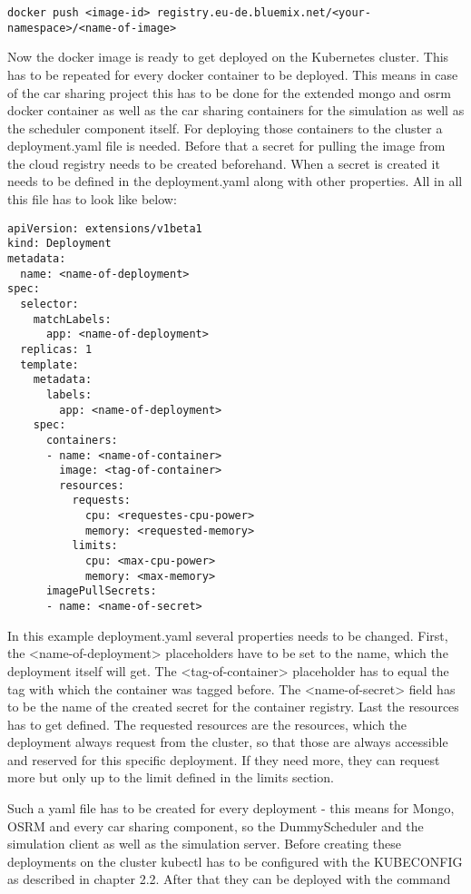 \begin{lstlisting}
docker push <image-id> registry.eu-de.bluemix.net/<your-namespace>/<name-of-image>
\end{lstlisting}

Now the docker image is ready to get deployed on the Kubernetes cluster. This has to be repeated for every docker container to be deployed. This means in case of the car sharing project this has to be done for the extended mongo and osrm docker container as well as the car sharing containers for the simulation as well as the scheduler component itself. For deploying those containers to the cluster a deployment.yaml file is needed. Before that a secret for pulling the image from the cloud registry needs to be created beforehand. When a secret is created it needs to be defined in the deployment.yaml along with other properties. All in all this file has to look like below:

\begin{lstlisting}
apiVersion: extensions/v1beta1
kind: Deployment
metadata:
  name: <name-of-deployment>
spec:
  selector:
    matchLabels:
      app: <name-of-deployment>
  replicas: 1
  template:
    metadata:
      labels:
        app: <name-of-deployment>
    spec:
      containers:
      - name: <name-of-container>
        image: <tag-of-container>
        resources:
          requests:
            cpu: <requestes-cpu-power>
            memory: <requested-memory>
          limits:
            cpu: <max-cpu-power>
            memory: <max-memory>
      imagePullSecrets:
      - name: <name-of-secret>
\end{lstlisting}

In this example deployment.yaml several properties needs to be changed. First, the <name-of-deployment> placeholders have to be set to the name, which the deployment itself will get. The <tag-of-container> placeholder has to equal the tag with which the container was tagged before. The <name-of-secret> field has to be the name of the created secret for the container registry. Last the resources has to get defined. The requested resources are the resources, which the deployment always request from the cluster, so that those are always accessible and reserved for this specific deployment. If they need more, they can request more but only up to the limit defined in the limits section.

Such a yaml file has to be created for every deployment - this means for Mongo, OSRM and every car sharing component, so the DummyScheduler and the simulation client as well as the simulation server. Before creating these deployments on the cluster kubectl has to be configured with the KUBECONFIG as described in chapter 2.2. After that they can be deployed with the command


